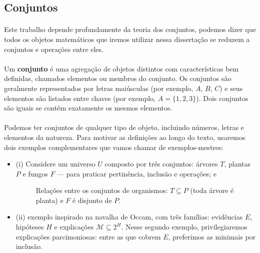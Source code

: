 \documentclass[12pt,a4paper]{article}
\begin{document}
\subsection{Conjuntos}
\paragraph{}
Este trabalho depende profundamente da teoria dos conjuntos, podemos dizer que todos os objetos matemáticos que iremos utilizar nessa dissertação se reduzem a conjuntos e operações entre eles.

\paragraph{}
Um \textbf{conjunto} é uma agregação de objetos distintos com características bem definidas, chamados elementos ou membros do conjunto. Os conjuntos são geralmente representados por letras maiúsculas (por exemplo, \(A\), \(B\), \(C\)) e seus elementos são listados entre chaves (por exemplo, \(A = \{1, 2, 3\}\)). Dois conjuntos são iguais se contêm exatamente os mesmos elementos.

\paragraph{}
Podemos ter conjuntos de qualquer tipo de objeto, incluindo números, letras e elementos da natureza. Para motivar as definições ao longo do texto, usaremos dois exemplos complementares que vamos chamar de exemplos-mestres:
\begin{itemize}
    \item (i) Considere um universo \(U\) composto por três conjuntos: árvores \(T\), plantas \(P\) e fungos \(F\) — para praticar pertinência, inclusão e operações; e
    
    \begin{figure}[H]
    \centering
    \caption{Relações entre os conjuntos de organismos: $T\subseteq P$ (toda árvore é planta) e $F$ é disjunto de $P$.}
    \label{fig:organismos}
    \end{figure}

    \item (ii) exemplo inspirado na navalha de Occam, com três famílias: evidências \(E\), hipóteses \(H\) e explicações \(\mathcal{M} \subseteq 2^{H}\). Nesse segundo exemplo, privilegiaremos explicações parcimoniosas: entre as que cobrem \(E\), preferimos as minimais por inclusão.
\end{itemize}
\end{document}
